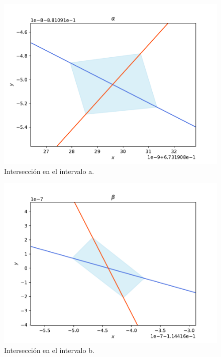 \begin{figure}[H]
\centering
\includegraphics[scale=0.4]{cruce_a}
\caption{Intersección en el intervalo a.}
\label{jung_corte1}
\end{figure}


\begin{figure}[H]
\centering
\includegraphics[scale=0.4]{cruce_b}
\caption{Intersección en el intervalo b.}
\label{jung_corte2}
\end{figure}


